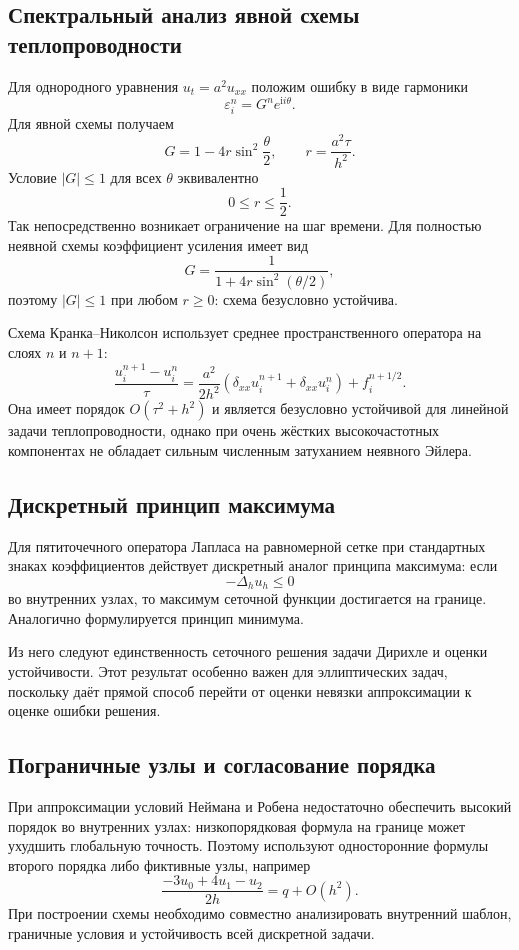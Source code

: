 \subsection{Спектральный анализ явной схемы теплопроводности}

Для однородного уравнения $u_t=a^2u_{xx}$ положим ошибку в виде гармоники
\[
    \varepsilon_i^n=G^n e^{\mathrm i i\theta}.
\]
Для явной схемы получаем
\[
    G=1-4r\sin^2\frac{\theta}{2},
    \qquad r=\frac{a^2\tau}{h^2}.
\]
Условие $|G|\le1$ для всех $\theta$ эквивалентно
\[
    0\le r\le\frac12.
\]
Так непосредственно возникает ограничение на шаг времени. Для полностью неявной схемы
коэффициент усиления имеет вид
\[
    G=\frac{1}{1+4r\sin^2(\theta/2)},
\]
поэтому $|G|\le1$ при любом $r\ge0$: схема безусловно устойчива.

Схема Кранка--Николсон использует среднее пространственного оператора на слоях $n$ и
$n+1$:
\[
 \frac{u_i^{n+1}-u_i^n}{\tau}
 =\frac{a^2}{2h^2}
 \left(\delta_{xx}u_i^{n+1}+\delta_{xx}u_i^n\right)+f_i^{n+1/2}.
\]
Она имеет порядок $O(\tau^2+h^2)$ и является безусловно устойчивой для линейной задачи
теплопроводности, однако при очень жёстких высокочастотных компонентах не обладает
сильным численным затуханием неявного Эйлера.

\subsection{Дискретный принцип максимума}

Для пятиточечного оператора Лапласа на равномерной сетке при стандартных знаках
коэффициентов действует дискретный аналог принципа максимума: если
\[
    -\Delta_h u_h\le0
\]
во внутренних узлах, то максимум сеточной функции достигается на границе. Аналогично
формулируется принцип минимума.

Из него следуют единственность сеточного решения задачи Дирихле и оценки устойчивости.
Этот результат особенно важен для эллиптических задач, поскольку даёт прямой способ
перейти от оценки невязки аппроксимации к оценке ошибки решения.

\subsection{Пограничные узлы и согласование порядка}

При аппроксимации условий Неймана и Робена недостаточно обеспечить высокий порядок во
внутренних узлах: низкопорядковая формула на границе может ухудшить глобальную точность.
Поэтому используют односторонние формулы второго порядка либо фиктивные узлы, например
\[
    \frac{-3u_0+4u_1-u_2}{2h}=q+O(h^2).
\]
При построении схемы необходимо совместно анализировать внутренний шаблон, граничные
условия и устойчивость всей дискретной задачи.

